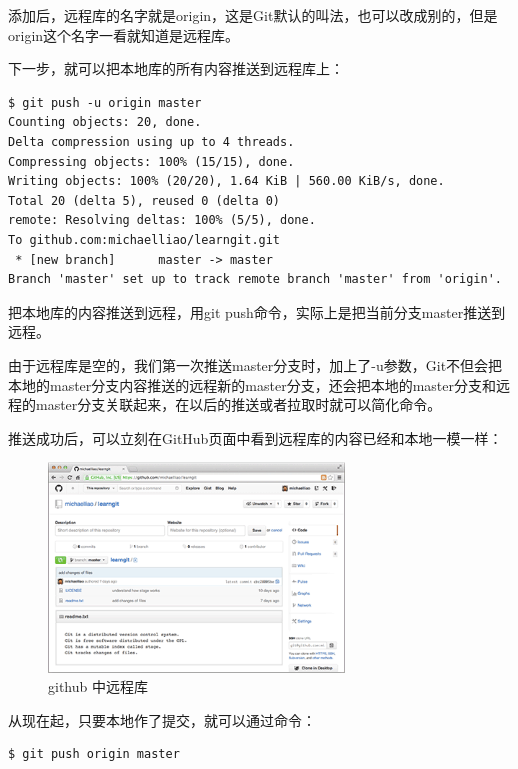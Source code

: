 添加后，远程库的名字就是origin，这是Git默认的叫法，也可以改成别的，但是origin这个名字一看就知道是远程库。

下一步，就可以把本地库的所有内容推送到远程库上：

\begin{verbatim}
$ git push -u origin master
Counting objects: 20, done.
Delta compression using up to 4 threads.
Compressing objects: 100% (15/15), done.
Writing objects: 100% (20/20), 1.64 KiB | 560.00 KiB/s, done.
Total 20 (delta 5), reused 0 (delta 0)
remote: Resolving deltas: 100% (5/5), done.
To github.com:michaelliao/learngit.git
 * [new branch]      master -> master
Branch 'master' set up to track remote branch 'master' from 'origin'.
\end{verbatim}

把本地库的内容推送到远程，用git push命令，实际上是把当前分支master推送到远程。

由于远程库是空的，我们第一次推送master分支时，加上了-u参数，Git不但会把本地的master分支内容推送的远程新的master分支，还会把本地的master分支和远程的master分支关联起来，在以后的推送或者拉取时就可以简化命令。

推送成功后，可以立刻在GitHub页面中看到远程库的内容已经和本地一模一样：


\begin{figure}[h]
  \centering
  \includegraphics[width=0.7\textwidth]{img/github-repo.png}
  \caption{github 中远程库}
  \label{fig:mesh1}
\end{figure}

从现在起，只要本地作了提交，就可以通过命令：

\begin{verbatim}
$ git push origin master
\end{verbatim}

